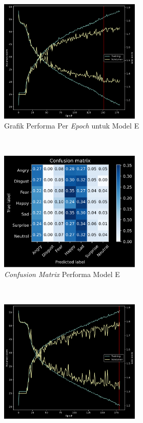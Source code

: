 \begin{figure}[t]
    \centering
    \begin{subfigure}[t]{6.75cm}
        \includegraphics[width=6.75cm]{gambar/eksperimen4b2_grafik1.png}
        \caption{Grafik Performa Per \textit{Epoch} untuk Model E}
        \label{fig:grafikeksperimen4b21}
    \end{subfigure}
    ~~~
    \begin{subfigure}[t]{6.75cm}
        \includegraphics[width=6.75cm]{gambar/eksperimen4b2_matriks1.png}
        \caption{\textit{Confusion Matrix} Performa Model E}
        \label{fig:confusionmatrixeksperimen4b21}
    \end{subfigure}
    ~~~
    \begin{subfigure}[t]{6.75cm}
        \includegraphics[width=6.75cm]{gambar/eksperimen4b2_grafik2.png}

\end{subfigure}
\end{figure}
